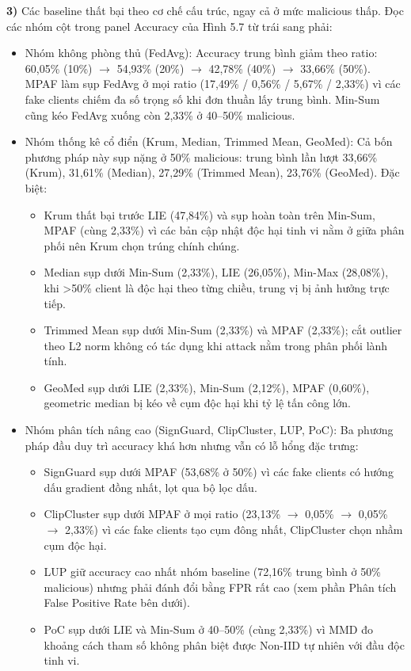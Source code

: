 \textbf{3)} Các baseline thất bại theo cơ chế cấu trúc, ngay cả ở mức malicious thấp. Đọc các nhóm cột trong panel Accuracy của Hình 5.7 từ trái sang phải:

\begin{itemize}
\item
  Nhóm không phòng thủ (FedAvg): Accuracy trung bình giảm theo ratio: 60,05\% (10\%) $\rightarrow$ 54,93\% (20\%) $\rightarrow$ 42,78\% (40\%) $\rightarrow$ 33,66\% (50\%). MPAF làm sụp FedAvg ở mọi ratio (17,49\% / 0,56\% / 5,67\% / 2,33\%) vì các fake clients chiếm đa số trọng số khi đơn thuần lấy trung bình. Min-Sum cũng kéo FedAvg xuống còn 2,33\% ở 40--50\% malicious.
\item
  Nhóm thống kê cổ điển (Krum, Median, Trimmed Mean, GeoMed): Cả bốn phương pháp này sụp nặng ở 50\% malicious: trung bình lần lượt 33,66\% (Krum), 31,61\% (Median), 27,29\% (Trimmed Mean), 23,76\% (GeoMed). Đặc biệt:

  \begin{itemize}
  \item
    Krum thất bại trước LIE (47,84\%) và sụp hoàn toàn trên Min-Sum, MPAF (cùng 2,33\%) vì các bản cập nhật độc hại tinh vi nằm ở giữa phân phối nên Krum chọn trúng chính chúng.
  \item
    Median sụp dưới Min-Sum (2,33\%), LIE (26,05\%), Min-Max (28,08\%), khi \textgreater50\% client là độc hại theo từng chiều, trung vị bị ảnh hưởng trực tiếp.
  \item
    Trimmed Mean sụp dưới Min-Sum (2,33\%) và MPAF (2,33\%); cắt outlier theo L2 norm không có tác dụng khi attack nằm trong phân phối lành tính.
  \item
    GeoMed sụp dưới LIE (2,33\%), Min-Sum (2,12\%), MPAF (0,60\%), geometric median bị kéo về cụm độc hại khi tỷ lệ tấn công lớn.
  \end{itemize}
\item
  Nhóm phân tích nâng cao (SignGuard, ClipCluster, LUP, PoC): Ba phương pháp đầu duy trì accuracy khá hơn nhưng vẫn có lỗ hổng đặc trưng:

  \begin{itemize}
  \item
    SignGuard sụp dưới MPAF (53,68\% ở 50\%) vì các fake clients có hướng dấu gradient đồng nhất, lọt qua bộ lọc dấu.
  \item
    ClipCluster sụp dưới MPAF ở mọi ratio (23,13\% $\rightarrow$ 0,05\% $\rightarrow$ 0,05\% $\rightarrow$ 2,33\%) vì các fake clients tạo cụm đông nhất, ClipCluster chọn nhầm cụm độc hại.
  \item
    LUP giữ accuracy cao nhất nhóm baseline (72,16\% trung bình ở 50\% malicious) nhưng phải đánh đổi bằng FPR rất cao (xem phần Phân tích False Positive Rate bên dưới).
  \item
    PoC sụp dưới LIE và Min-Sum ở 40--50\% (cùng 2,33\%) vì MMD đo khoảng cách tham số không phân biệt được Non-IID tự nhiên với đầu độc tinh vi.
  \end{itemize}
\end{itemize}

